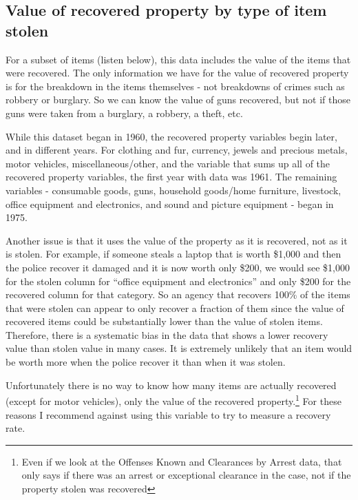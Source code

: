 \documentclass[
]{krantz}
\begin{document}
\subsection{Value of recovered property by type of item
stolen}\label{value-of-recovered-property-by-type-of-item-stolen}

For a subset of items (listen below), this data includes the
value of the items that were recovered. The only information
we have for the value of recovered property is for the
breakdown in the items themselves - not breakdowns of crimes
such as robbery or burglary. So we can know the value of
guns recovered, but not if those guns were taken from a
burglary, a robbery, a theft, etc.

While this dataset began in 1960, the recovered property
variables begin later, and in different years. For clothing
and fur, currency, jewels and precious metals, motor
vehicles, miscellaneous/other, and the variable that sums up
all of the recovered property variables, the first year with
data was 1961. The remaining variables - consumable goods,
guns, household goods/home furniture, livestock, office
equipment and electronics, and sound and picture equipment -
began in 1975.

Another issue is that it uses the value of the property as
it is recovered, not as it is stolen. For example, if
someone steals a laptop that is worth \$1,000 and then the
police recover it damaged and it is now worth only \$200, we
would see \$1,000 for the stolen column for ``office
equipment and electronics'' and only \$200 for the recovered
column for that category. So an agency that recovers 100\%
of the items that were stolen can appear to only recover a
fraction of them since the value of recovered items could be
substantially lower than the value of stolen items.
Therefore, there is a systematic bias in the data that shows
a lower recovery value than stolen value in many cases. It
is extremely unlikely that an item would be worth more when
the police recover it than when it was stolen.

Unfortunately there is no way to know how many items are
actually recovered (except for motor vehicles), only the
value of the recovered property.\footnote{Even if we look at
  the Offenses Known and Clearances by Arrest data, that
  only says if there was an arrest or exceptional clearance
  in the case, not if the property stolen was recovered} For
these reasons I recommend against using this variable to try
to measure a recovery rate.
\end{document}
